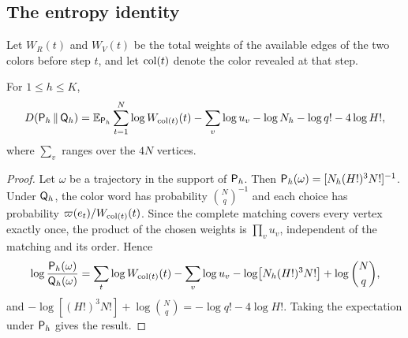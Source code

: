 \subsection{The entropy identity}

Let $W_R(t)$ and $W_V(t)$ be the total weights of the available edges of the two colors before step $t$, and
let $\mathrm{col}(t)$ denote the
color revealed at that step.

\begin{lema}\label{lem:identidad} For $1\le h\le K$, \[
 D(\mathsf{P}_h\,\Vert\,\mathsf{Q}_h)=\mathbb{E}_{\mathsf{P}_h}\sum_{t=1}^N\log W_{\mathrm{col}(t)}(t)-\sum_v\log u_v-\log N_h-\log q!
 -4\log H!,
\] where $\sum_v$ ranges over the $4N$ vertices. \end{lema}

\begin{proof} Let $\omega$ be a trajectory in the support of $\mathsf{P}_h$. Then
$\mathsf{P}_h(\omega)=[N_h(H!)^3N!]^{-1}$. Under $\mathsf{Q}_h$, the color
word has probability $\binom Nq^{-1}$ and each choice has probability $\varpi(e_t)/W_{\mathrm{col}(t)}(t)$. Since
the complete matching covers
every vertex exactly once, the product of the chosen weights is $\prod_vu_v$, independent of the matching
and its order. Hence \[
 \log\frac{\mathsf{P}_h(\omega)}{\mathsf{Q}_h(\omega)}=\sum_t\log W_{\mathrm{col}(t)}(t)-\sum_v\log u_v
 -\log\bigl[N_h(H!)^3N!\bigr]+\log\binom Nq ,
\] and $-\log[(H!)^3N!]+\log\binom Nq=-\log q!-4\log H!$. Taking the expectation under $\mathsf{P}_h$ gives the
result. \end{proof}
